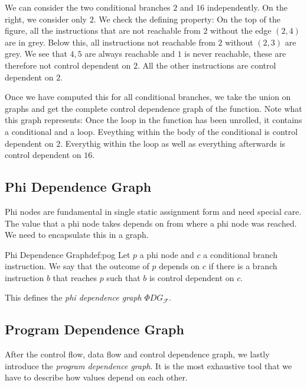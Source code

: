     We can consider the two conditional branches $2$ and $16$ independently.
    On the right, we consider only $2$.
    We check the defining property: On the top of the figure, all the
    instructions that are not reachable from $2$ without the edge $(2,4)$ are in
    grey.
    Below this, all instructions not reachable from $2$ without $(2,3)$ are
    grey.
    We see that $4,5$ are always reachable and $1$ is never reachable, these are
    therefore not control dependent on $2$.
    All the other instructions are control dependent on $2$.

    Once we have computed this for all conditional branches, we take the union
    on graphs and get the complete control dependence graph of the function.
    Note what this graph represents:
    Once the loop in the function has been unrolled, it contains a conditional
    and a loop.
    Eveything within the body of the conditional is control dependent on $2$.
    Everythig within the loop as well as everything afterwards is control
    dependent on $16$.

\subsection{Phi Dependence Graph}

    Phi nodes are fundamental in single static assignment form and need special
    care.
    The value that a phi node takes depends on from where a phi node was
    reached.
    We need to encapsulate this in a graph.

    \begin{definition}{Phi Dependence Graph}{def:pog}
        Let $p$ a phi node and $c$ a conditional branch instruction.
        We say that the outcome of $p$ depends on $c$ if there is a branch
        instruction $b$ that reaches $p$ such that $b$ is control dependent on
        $c$.

        This defines the {\em phi dependence graph} $\Phi DG_\mathcal{F}$.
    \end{definition}

\subsection{Program Dependence Graph}

    After the control flow, data flow and control dependence graph, we lastly
    introduce the {\em program dependence graph}.
    It is the most exhaustive tool that we have to describe how values depend on
    each other.

